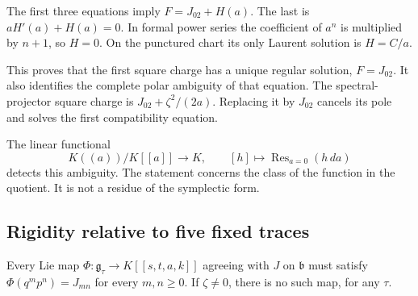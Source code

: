 The first three equations imply
$F=J_{02}+H(a)$. The last is $aH'(a)+H(a)=0$. In formal power series
the coefficient of $a^n$ is multiplied by $n+1$, so $H=0$.
On the punctured chart its only Laurent solution is $H=C/a$.

This proves that the first square charge has a unique regular solution,
$F=J_{02}$. It also identifies the complete polar ambiguity of that
equation. The spectral-projector square charge is
$J_{02}+\zeta^2/(2a)$. Replacing it by $J_{02}$ cancels its pole and
solves the first compatibility equation.

The linear functional
\[
 K((a))/K[[a]]\longrightarrow K,
 \qquad [h]\longmapsto\operatorname{Res}_{a=0}(h\,da)
\]
detects this ambiguity. The statement concerns the class of the function
in the quotient. It is not a residue of the symplectic form.

\subsection{Rigidity relative to five fixed traces}
\label{mht:frgl:sec:rigidity}

\begin{theorem}
\label{mht:frgl:thm:local-rigidity}
Every Lie map $\Phi:\mathfrak g_\tau\to K[[s,t,a,k]]$ agreeing with
$J$ on $\mathfrak b$ must satisfy $\Phi(q^mp^n)=J_{mn}$ for every
$m,n\geq0$. If $\zeta\ne0$, there is no such map, for any $\tau$.
\end{theorem}

